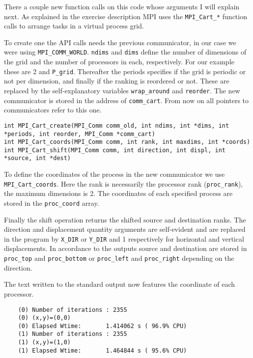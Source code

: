 There a couple new function calls on this code whose arguments I will explain next.
As explained in the exercise description MPI uses the \texttt{MPI\_Cart\_*} function calls to arrange tasks in a virtual process grid.

To create one the API calls needs the previous communicator, in our case we were using \texttt{MPI\_COMM\_WORLD}. \texttt{ndims} and \texttt{dims} define the number of dimensions of the grid and the number of processors in each, respectively. For our example these are 2 and \texttt{P\_grid}. Thereafter the periods specifies if the grid is periodic or not per dimension, and finally if the ranking is reordered or not. These are replaced by the self-explanatory variables \texttt{wrap\_around} and \texttt{reorder}. The new communicator is stored in the address of \texttt{comm\_cart}. From now on all pointers to communicators refer to this one.

\begin{lstlisting}
int MPI_Cart_create(MPI_Comm comm_old, int ndims, int *dims, int *periods, int reorder, MPI_Comm *comm_cart)
int MPI_Cart_coords(MPI_Comm comm, int rank, int maxdims, int *coords)
int MPI_Cart_shift(MPI_Comm comm, int direction, int displ, int *source, int *dest)
\end{lstlisting}

To define the coordinates of the process in the new communicator we use \texttt{MPI\_Cart\_coords}. Here the rank is necessarily the processor rank (\texttt{proc\_rank}), the maximum dimensions is 2. The coordinates of each specified process are stored in the \texttt{proc\_coord} array.

Finally the shift operation returns the shifted source and destination ranks. The direction and displacement quantity arguments are self-evident and are replaced in the program by \texttt{X\_DIR} or \texttt{Y\_DIR} and 1 respectively for horizontal and vertical displacements. In accordance to the outputs source and destination are stored in \texttt{proc\_top} and \texttt{proc\_bottom} or \texttt{proc\_left} and \texttt{proc\_right} depending on the direction. 


The text written to the standard output now features the coordinate of each processor.

\begin{lstlisting}
    (0) Number of iterations : 2355
    (0) (x,y)=(0,0)
    (0) Elapsed Wtime:       1.414062 s ( 96.9% CPU)
    (1) Number of iterations : 2355
    (1) (x,y)=(1,0)
    (1) Elapsed Wtime:       1.464844 s ( 95.6% CPU)
\end{lstlisting}

